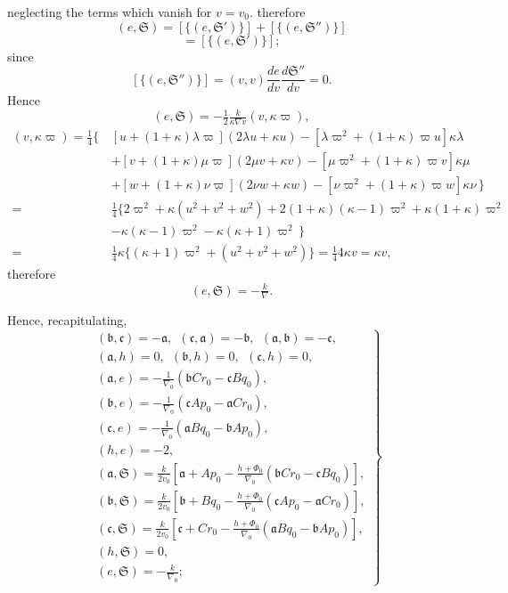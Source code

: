 \documentclass[11pt]{article}
\begin{document}
\newpage
\setcounter{page}{251}

neglecting the terms which vanish for $v = v_0$.
therefore
\[
(e, \mathfrak{S}) = [\{(e, \mathfrak{S}')\}] + [\{(e, \mathfrak{S}'')\}]
\]
\[
= [\{(e, \mathfrak{S}')\}];
\]
since
\[
[\{(e, \mathfrak{S}'')\}] = (v, v)\frac{de}{dv}\frac{d\mathfrak{S}''}{dv} = 0.
\]
Hence
\[
(e, \mathfrak{S}) = -\tfrac{1}{2}\tfrac{k}{\kappa\nabla v}(v, \kappa\varpi), \tag{58}
\]
\begin{align*}
(v, \kappa\varpi) = \tfrac{1}{4}\big\{\, & [u + (1 + \kappa)\lambda\varpi](2\lambda u + \kappa u) - [\lambda\varpi^2 + (1 + \kappa)\varpi u]\kappa\lambda \\
& + [v + (1 + \kappa)\mu\varpi](2\mu v + \kappa v) - [\mu\varpi^2 + (1 + \kappa)\varpi v]\kappa\mu \\
& + [w + (1 + \kappa)\nu\varpi](2\nu w + \kappa w) - [\nu\varpi^2 + (1 + \kappa)\varpi w]\kappa\nu\,\big\} \\
= {}&\tfrac{1}{4}\{2\varpi^2 + \kappa(u^2 + v^2 + w^2) + 2(1 + \kappa)(\kappa - 1)\varpi^2 + \kappa(1 + \kappa)\varpi^2 \\
& - \kappa(\kappa - 1)\varpi^2 - \kappa(\kappa + 1)\varpi^2\,\} \\
= {}&\tfrac{1}{4}\kappa\{(\kappa + 1)\varpi^2 + (u^2 + v^2 + w^2)\} = \tfrac{1}{4}4\kappa v = \kappa v, \tag{59}
\end{align*}
therefore
\[
(e, \mathfrak{S}) = -\tfrac{k}{\nabla}. \tag{60}
\]

Hence, recapitulating,
\[
\left.
\begin{aligned}
& (\mathfrak{b}, \mathfrak{c}) = -\mathfrak{a},\ \ (\mathfrak{c}, \mathfrak{a}) = -\mathfrak{b},\ \ (\mathfrak{a}, \mathfrak{b}) = -\mathfrak{c}, \\
& (\mathfrak{a}, h) = 0,\ \ (\mathfrak{b}, h) = 0,\ \ (\mathfrak{c}, h) = 0, \\
& (\mathfrak{a}, e) = -\tfrac{1}{\nabla_0}(\mathfrak{b}Cr_0 - \mathfrak{c}Bq_0), \\
& (\mathfrak{b}, e) = -\tfrac{1}{\nabla_0}(\mathfrak{c}Ap_0 - \mathfrak{a}Cr_0), \\
& (\mathfrak{c}, e) = -\tfrac{1}{\nabla_0}(\mathfrak{a}Bq_0 - \mathfrak{b}Ap_0), \\
& (h, e) = -2, \\
& (\mathfrak{a}, \mathfrak{S}) = \tfrac{k}{2v_0}\!\left[\mathfrak{a} + Ap_0 - \tfrac{h + \Phi_0}{\nabla_0}(\mathfrak{b}Cr_0 - \mathfrak{c}Bq_0)\right], \\
& (\mathfrak{b}, \mathfrak{S}) = \tfrac{k}{2v_0}\!\left[\mathfrak{b} + Bq_0 - \tfrac{h + \Phi_0}{\nabla_0}(\mathfrak{c}Ap_0 - \mathfrak{a}Cr_0)\right], \\
& (\mathfrak{c}, \mathfrak{S}) = \tfrac{k}{2v_0}\!\left[\mathfrak{c} + Cr_0 - \tfrac{h + \Phi_0}{\nabla_0}(\mathfrak{a}Bq_0 - \mathfrak{b}Ap_0)\right], \\
& (h, \mathfrak{S}) = 0, \\
& (e, \mathfrak{S}) = -\tfrac{k}{\nabla_0};
\end{aligned}
\right\} \tag{61}
\]
\end{document}
